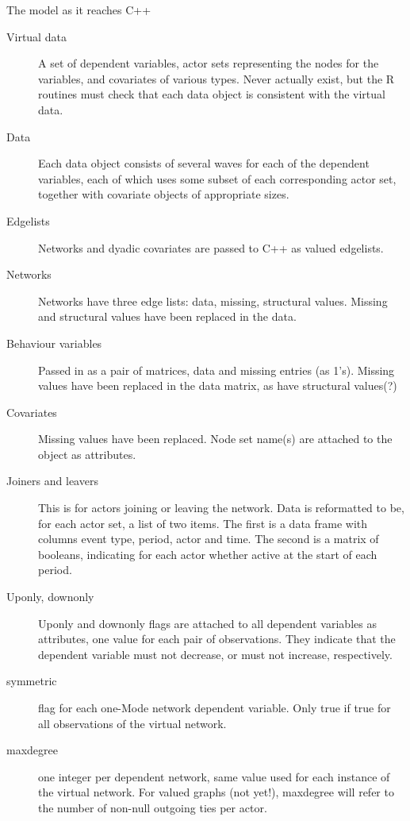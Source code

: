 \documentclass[12pt,a4paper]{article}
\makeatletter
\renewcommand{\=}{\,=\,}
\newcommand{\+}{\,+\,}
\newcommand{\R}{{\sf R }}
\renewcommand{\subsection}{\@startsection{subsection}{2}
                {0pt}{0.7\baselineskip}{0.3\baselineskip}
                {\sffamily} }
\makeatother
\begin{document}
\subsection{The model as it reaches C++}

\begin{description}
\item [Virtual data] A set of dependent variables, actor sets representing the
  nodes for the variables, and covariates of various types. Never actually
  exist, but the \R routines must check that each data object is consistent with
  the virtual data.
\item[Data] Each data object consists of several waves for each of the dependent
  variables, each of which uses some subset of each corresponding actor set,
  together with covariate objects of appropriate sizes.
\item[Edgelists] Networks and dyadic covariates are passed to C++ as valued
  edgelists.
\item [Networks] Networks have three edge lists: data, missing, structural
  values. Missing and structural values have been replaced in the data.
\item[Behaviour variables] Passed in as a pair of matrices, data and missing
  entries (as 1's). Missing values have been replaced in the data matrix, as
  have structural values(?)
\item [Covariates] Missing values have been replaced. Node set name(s) are
  attached to the object as attributes.
\item[Joiners and leavers] This is for actors joining or leaving the network.
  Data is reformatted to be, for each actor set, a list
  of two items. The first is a data frame with columns event type, period, actor
  and time. The second is a matrix of booleans, indicating for each actor
  whether active at the start of each period.
\item[Uponly, downonly] Uponly and downonly flags are attached to all dependent
  variables as attributes, one value for each pair of observations.
  They indicate that the dependent variable must not decrease, or must not
  increase, respectively.
\item[symmetric] flag for each one-Mode network dependent variable. Only true if
  true for all observations of the virtual network.
\item[maxdegree] one integer per dependent network, same value used for each
  instance of the virtual network.  For valued graphs (not yet!), maxdegree will
  refer to the number of non-null outgoing ties per actor.

\end{description}
\end{document}
